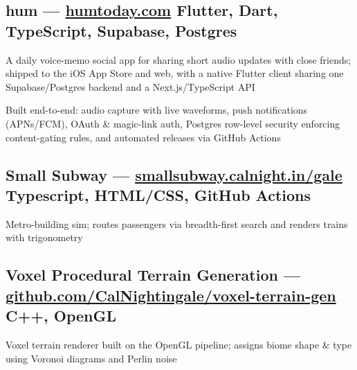 \subsection{{hum --- \href{https://humtoday.com}{humtoday.com} \hfill Flutter, Dart, TypeScript, Supabase, Postgres}}
\begin{zitemize}
\item A daily voice-memo social app for sharing short audio updates with close friends; shipped to the iOS App Store and web, with a native Flutter client sharing one Supabase/Postgres backend and a Next.js/TypeScript API
\item Built end-to-end: audio capture with live waveforms, push notifications (APNs/FCM), OAuth \& magic-link auth, Postgres row-level security enforcing content-gating rules, and automated releases via GitHub Actions
\end{zitemize}

\subsection{{Small Subway --- \href{https://smallsubway.calnight.in/gale/}{smallsubway.calnight.in/gale} \hfill Typescript, HTML/CSS, GitHub Actions}}
\begin{zitemize}
\item Metro-building sim; routes passengers via breadth-first search and renders trains with trigonometry
\end{zitemize}

\subsection{{Voxel Procedural Terrain Generation --- \href{https://github.com/CalNightingale/voxel-terrain-gen}{github.com/CalNightingale/voxel-terrain-gen} \hfill C++, OpenGL}}
\begin{zitemize}
\item Voxel terrain renderer built on the OpenGL pipeline; assigns biome shape \& type using Voronoi diagrams and Perlin noise
\end{zitemize}

